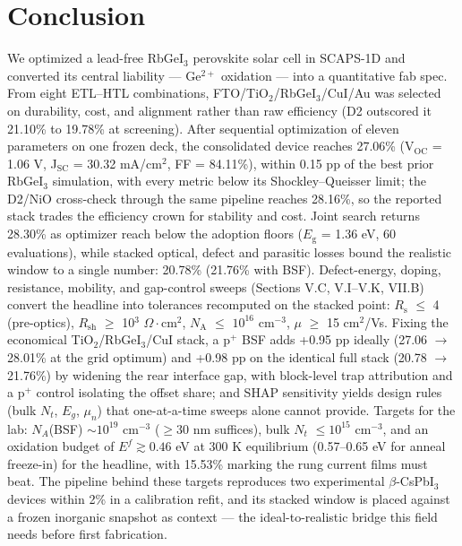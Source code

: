 \documentclass[aip,jap,amsmath,amssymb,preprint]{revtex4-2}
\begin{document}
\section{Conclusion}
We optimized a lead-free RbGeI$_{3}$ perovskite solar cell in SCAPS-1D and converted its central liability --- Ge$^{2+}$ oxidation --- into a quantitative fab spec. From eight ETL--HTL combinations, FTO/\allowbreak{}TiO$_{2}$/RbGeI$_{3}$/CuI/\allowbreak{}Au was selected on durability, cost, and alignment rather than raw efficiency (D2 outscored it 21.10\% to 19.78\% at screening).
After sequential optimization of eleven parameters on one frozen deck, the consolidated device reaches 27.06\% (V$_{\mathrm{OC}}$ = 1.06 V, J$_{\mathrm{SC}}$ = 30.32 mA/cm$^{2}$, FF = 84.11\%), within 0.15 pp of the best prior RbGeI$_{3}$ simulation, with every metric below its Shockley--Queisser limit; the D2/NiO cross-check through the same pipeline reaches 28.16\%, so the reported stack trades the efficiency crown for stability and cost. Joint search returns 28.30\% as optimizer reach below the adoption floors ($E_{\mathrm{g}}$ = 1.36 eV, 60 evaluations), while stacked optical, defect and parasitic losses bound the realistic window to a single number: 20.78\% (21.76\% with BSF). Defect-energy, doping, resistance, mobility, and gap-control sweeps (Sections V.C, V.I--V.K, VII.B) convert the headline into tolerances recomputed on the stacked point: $R_{\mathrm{s}}$ $\le$ 4 (pre-optics), $R_{\mathrm{sh}}$ $\ge$ 10$^{3}$ $\Omega\cdot$cm$^{2}$, $N_{\mathrm{A}}$ $\le$ $10^{16}$ cm$^{-3}$, $\mu$ $\ge$ 15 cm$^{2}$/Vs. Fixing the economical TiO$_{2}$/RbGeI$_{3}$/CuI stack, a p$^{+}$ BSF adds +0.95 pp ideally (27.06 $\rightarrow$ 28.01\% at the grid optimum) and +0.98 pp on the identical full stack (20.78 $\rightarrow$ 21.76\%) by widening the rear interface gap, with block-level trap attribution and a p$^{+}$ control isolating the offset share; and SHAP sensitivity yields design rules (bulk $N_{t}$, $E_{g}$, $\mu_{n}$) that one-at-a-time sweeps alone cannot provide. Targets for the lab: $N_{A}$(BSF) $\sim$$10^{19}$ cm$^{-3}$ ($\ge$30 nm suffices), bulk $N_{t}$ $\le$$10^{15}$ cm$^{-3}$, and an oxidation budget of $E^f\gtrsim0.46$ eV at 300 K equilibrium (0.57--0.65 eV for anneal freeze-in) for the headline, with 15.53\% marking the rung current films must beat. The pipeline behind these targets reproduces two experimental $\beta$-CsPbI$_{3}$ devices within 2\% in a calibration refit, and its stacked window is placed against a frozen inorganic snapshot as context --- the ideal-to-realistic bridge this field needs before first fabrication.
\end{document}
